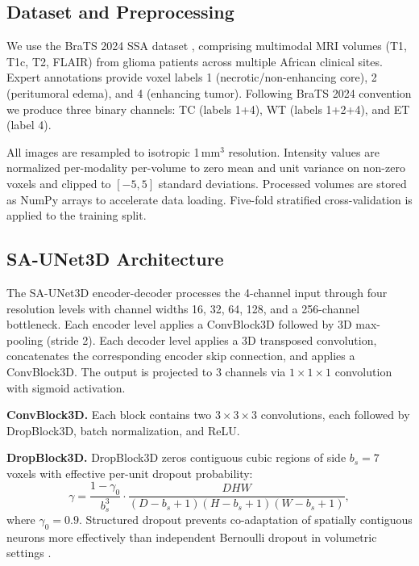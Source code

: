 \documentclass[conference]{IEEEtran}
\begin{document}
\subsection{Dataset and Preprocessing}

We use the BraTS 2024 SSA dataset \cite{b1}, comprising multimodal
MRI volumes (T1, T1c, T2, FLAIR) from glioma patients across
multiple African clinical sites. Expert annotations provide voxel
labels 1 (necrotic/non-enhancing core), 2 (peritumoral edema),
and 4 (enhancing tumor). Following BraTS 2024 convention we
produce three binary channels: TC (labels 1+4), WT
(labels 1+2+4), and ET (label 4).

All images are resampled to isotropic 1\,mm$^3$ resolution.
Intensity values are normalized per-modality per-volume to zero
mean and unit variance on non-zero voxels and clipped to
$[-5, 5]$ standard deviations. Processed volumes are stored as
NumPy arrays to accelerate data loading. Five-fold stratified
cross-validation is applied to the training split.

\subsection{SA-UNet3D Architecture}

The SA-UNet3D encoder-decoder processes the 4-channel input
through four resolution levels with channel widths 16, 32, 64, 128,
and a 256-channel bottleneck. Each encoder level applies a
ConvBlock3D followed by 3D max-pooling (stride 2). Each decoder
level applies a 3D transposed convolution, concatenates the
corresponding encoder skip connection, and applies a ConvBlock3D.
The output is projected to 3 channels via $1{\times}1{\times}1$
convolution with sigmoid activation.

\textbf{ConvBlock3D.} Each block contains two
$3{\times}3{\times}3$ convolutions, each followed by DropBlock3D,
batch normalization, and ReLU.

\textbf{DropBlock3D.} DropBlock3D zeros contiguous cubic regions
of side $b_s=7$ voxels with effective per-unit dropout probability:
\begin{equation}
  \gamma = \frac{1 - \gamma_0}{b_s^3}
           \cdot \frac{DHW}{(D{-}b_s{+}1)(H{-}b_s{+}1)(W{-}b_s{+}1)},
\end{equation}
where $\gamma_0 = 0.9$. Structured dropout prevents co-adaptation
of spatially contiguous neurons more effectively than independent
Bernoulli dropout in volumetric settings \cite{b13}.
\end{document}
